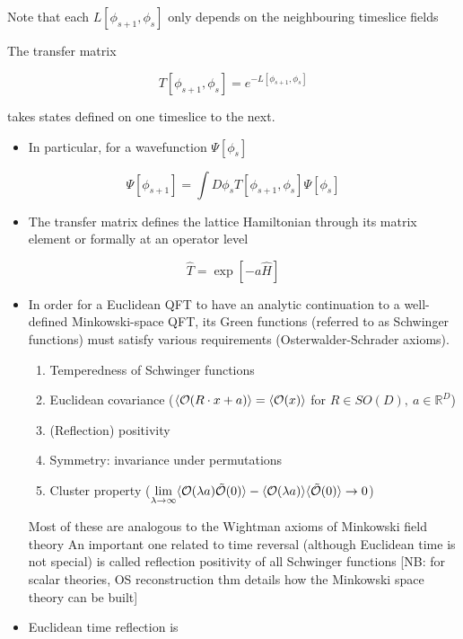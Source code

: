 Note that each \(L\left[\phi_{s+1}, \phi_{s}\right]\) only depends on the neighbouring timeslice fields

The transfer matrix

\begin{equation}
T\left[\phi_{s+1}, \phi_{s}\right]=e^{-L\left[\phi_{s+1}, \phi_{s}\right]}
\end{equation}

takes states defined on one timeslice to the next.

\begin{itemize}
  \item In particular, for a wavefunction \(\Psi\left[\phi_{s}\right]\)
\end{itemize}

\begin{equation}
\Psi\left[\phi_{s+1}\right]=\int D \phi_{s} T\left[\phi_{s+1}, \phi_{s}\right] \Psi\left[\phi_{s}\right]
\end{equation}

\begin{itemize}
  \item The transfer matrix defines the lattice Hamiltonian through its matrix element or formally at an operator level
\end{itemize}

\begin{equation}
\hat{T}=\exp [-a \hat{H}]
\end{equation}

\begin{itemize}
  \item In order for a Euclidean QFT to have an analytic continuation to a well-defined Minkowski-space QFT, its Green functions (referred to as Schwinger functions) must satisfy various requirements (Osterwalder-Schrader axioms). 
  \begin{enumerate}
      \item Temperedness of Schwinger functions
      \item Euclidean covariance ($\langle {\cal O}(R\cdot x+a)\rangle=\langle {\cal O}(x)\rangle$ for $R\in SO(D),\ a\in \mathbb{R}^D$)
      \item (Reflection) positivity
      \item Symmetry: invariance under permutations
      \item Cluster property ($\underset{\lambda\to\infty}{\lim}\langle {\cal O}(\lambda a)\tilde{\cal O}(0)\rangle-\langle{\cal O}(\lambda a)\rangle\langle\tilde{\cal O}(0)\rangle\to0$)
  \end{enumerate}
  Most of these are analogous to the Wightman axioms of Minkowski field theory
  An important one related to time reversal (although Euclidean time is not special) is called reflection positivity of all Schwinger functions
[NB: for scalar theories, OS reconstruction thm details how the Minkowski space theory can be built]
  \item Euclidean time reflection is
\end{itemize}

